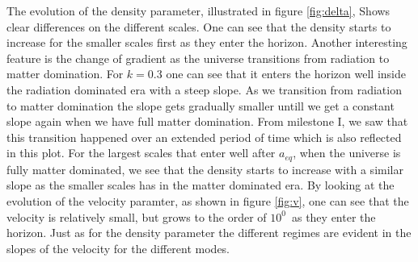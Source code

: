 \documentclass[onecolumn]{aastex62}
\begin{document}
The evolution of the density parameter, illustrated in figure \ref{fig:delta}, Shows clear differences on the different scales. One can see that the density starts to increase for the smaller scales first as they enter the horizon. Another interesting feature is the change of gradient as the universe transitions from radiation to matter domination. For $k=0.3$ one can see that it enters the horizon well inside the radiation dominated era with a steep slope. As we transition from radiation to matter domination the slope gets gradually smaller untill we get a constant slope again when we have full matter domination. From milestone I, we saw that this transition happened over an extended period of time which is also reflected in this plot. For the largest scales that enter well after $a_{eq}$, when the universe is fully matter dominated, we see that the density starts to increase with a similar slope as the smaller scales has in the matter dominated era. By looking at the evolution of the velocity paramter, as shown in figure \ref{fig:v}, one can see that the velocity is relatively small, but grows to the order of $10^0$ as they enter the horizon. Just as for the density parameter the different regimes are evident in the slopes of the velocity for the different modes.



\end{document}
